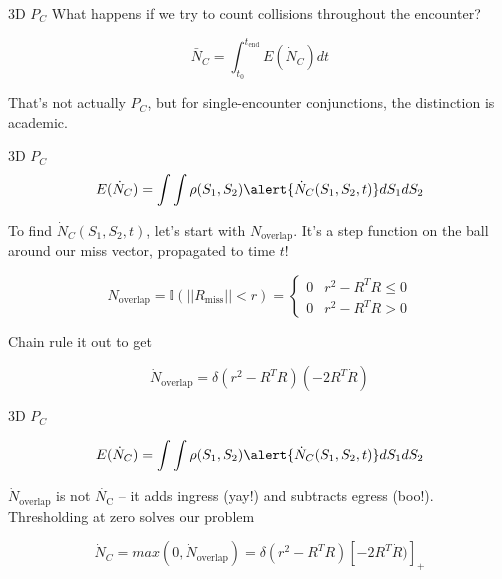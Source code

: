 \documentclass[pdf]{beamer}
\begin{document}
\begin{frame}{3D $P_C$}
  What happens if we try to count collisions throughout the encounter?

  \[ \bar{N}_C = \int_{t_0}^{t_\text{end}} E(\dot{N}_C) dt\]

  That's not actually $P_C$, but for single-encounter conjunctions, the
  distinction is academic.
\end{frame}


\begin{frame}{3D $P_C$}
  \[ E(\dot{N}_C) = \int \int \rho(S_1, S_2) \alert{\dot{N}_C(S_1, S_2, t)} dS_1dS_2\]

  To find $\dot{N}_C(S_1, S_2, t)$, let's start with $N_\text{overlap}$. It's a step function on the
  ball around our miss vector, propagated to time $t$!

  \[ N_\text{overlap} = \mathbb{I}(||R_\text{miss}|| < r) = \begin{cases} 
      0 & r^2 - R^T R \leq 0 \\
      0 & r^2 - R^T R > 0 
    \end{cases}
  \]

  Chain rule it out to get

  \[ \dot{N}_\text{overlap} = \delta(r^2 - R^T R)(-2R^T \dot{R})\]
\end{frame}

\begin{frame}{3D $P_C$}

  \[ E(\dot{N}_C) = \int \int \rho(S_1, S_2) \alert{\dot{N}_C(S_1, S_2, t)} dS_1dS_2\]

  $\dot{N}_\text{overlap}$ is not $\dot{N_\text{C}}$ -- it adds ingress
  (yay!) and subtracts egress (boo!). Thresholding at zero solves our problem

  \[ \dot{N}_C = max(0, \dot{N}_\text{overlap}) = \delta(r^2 - R^T R)[-2R^T \dot{R})]_{+}\]
  
\end{frame}
\end{document}
